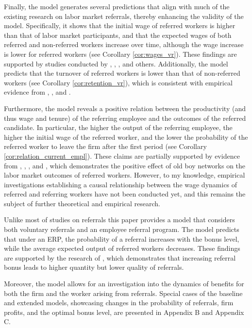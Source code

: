 \documentclass[12pt]{article}
\begin{document}
Finally, the model generates several predictions that align with much of the existing research on labor market referrals, thereby enhancing the validity of the model. Specifically, it shows that the initial wage of referred workers is higher than that of labor market participants, and that the expected wages of both referred and non-referred workers increase over time, although the wage increase is lower for referred workers (see Corollary \ref{cor:wages_vr}). These findings are supported by studies conducted by \cite{corcoran1980most}, \cite{montgomery1991social}, \cite{dustmann2016referral}, and others. Additionally, the model predicts that the turnover of referred workers is lower than that of non-referred workers (see Corollary \ref{cor:retention_vr}), which is consistent with empirical evidence from \cite{pallais2016referential}, \cite{lalanne2016old}, and \cite{lalanne2021social}.

Furthermore, the model reveals a positive relation between the productivity (and thus wage and tenure) of the referring employee and the outcomes of the referred candidate. In particular, the higher the output of the referring employee, the higher the initial wage of the referred worker, and the lower the probability of the referred worker to leave the firm after the first period (see Corollary \ref{cor:relation_current_empl}). These claims are partially supported by evidence from \cite{simon1992matchmaker}, \cite{kugler2003employee}, \cite{pallais2016referential}, and \cite{levati2020impact}, which demonstrates the positive effect of old boy networks on the labor market outcomes of referred workers. However, to my knowledge, empirical investigations establishing a causal relationship between the wage dynamics of referred and referring workers have not been conducted yet, and this remains the subject of further theoretical and empirical research.

Unlike most of studies on referrals this paper provides a model that considers both voluntary referrals and an employee referral program. The model predicts that under an ERP, the probability of a referral increases with the bonus level, while the average expected output of referred workers decreases. These findings are supported by the research of \cite{friebel2023employee}, which demonstrates that increasing referral bonus leads to higher quantity but lower quality of referrals.

Moreover, the model allows for an investigation into the dynamics of benefits for both the firm and the worker arising from referrals. Special cases of the baseline and extended models, showcasing changes in the probability of referrals, firm profits, and the optimal bonus level, are presented in Appendix B and Appendix C.
\end{document}
